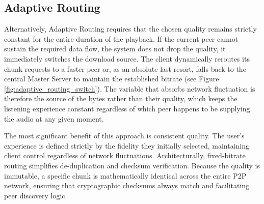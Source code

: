\subsection{Adaptive Routing}
\indent \par Alternatively, Adaptive Routing requires that the chosen quality remains strictly constant for the entire duration of the playback. If the current peer cannot sustain the required data flow, the system does not drop the quality, it immediately switches the download source. The client dynamically reroutes its chunk requests to a faster peer or, as an absolute last resort, falls back to the central Master Server to maintain the established bitrate (see Figure \ref{fig:adaptive_routing_switch}). The variable that absorbs network fluctuation is therefore the source of the bytes rather than their quality, which keeps the listening experience constant regardless of which peer happens to be supplying the audio at any given moment.

\par The most significant benefit of this approach is consistent quality. The user's experience is defined strictly by the fidelity they initially selected, maintaining client control regardless of network fluctuations. Architecturally, fixed-bitrate routing simplifies de-duplication and checksum verification. Because the quality is immutable, a specific chunk is mathematically identical across the entire P2P network, ensuring that cryptographic checksums always match and facilitating peer discovery logic.

